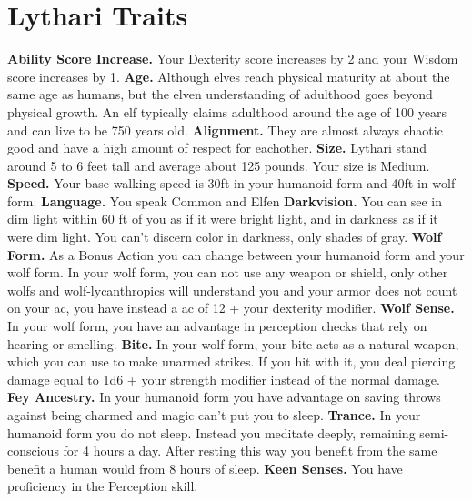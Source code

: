 \documentclass[a4paper,10pt,twoside,twocolumn, bg=print]{dndbook} %
\begin{document}
	\section{Lythari Traits}
	\textbf{Ability Score Increase.} Your Dexterity score increases by 2 and your Wisdom score increases by 1.\linebreak
	\textbf{Age.} Although elves reach physical maturity at about the same age as humans, but the elven understanding of adulthood goes beyond physical growth. An elf typically claims adulthood around the age of 100 years and can live to be 750 years old.\linebreak
	\textbf{Alignment.} They are almost always chaotic good and have a high amount of respect for eachother.\linebreak
	\textbf{Size.} Lythari stand around 5 to 6 feet tall and average about 125 pounds. Your size is Medium.\linebreak
	\textbf{Speed.} Your base walking speed is 30ft in your humanoid form and 40ft in wolf form.\linebreak
	\textbf{Language.} You speak Common and Elfen\linebreak
	\textbf{Darkvision.} You can see in dim light within 60 ft of you as if it were bright light, and in darkness as if it were dim light. You can't discern color in darkness, only shades of gray.\linebreak
	\textbf{Wolf Form.} As a Bonus Action you can change between your humanoid form and your wolf form. In your wolf form, you can not use any weapon or shield, only other wolfs and wolf-lycanthropics will understand you and your armor does not count on your ac, you have instead a ac of 12 + your dexterity modifier.\linebreak
	\textbf{Wolf Sense.} In your wolf form, you have an advantage in perception checks that rely on hearing or smelling.\linebreak
	\textbf{Bite.} In your wolf form, your bite acts as a natural weapon, which you can use to make unarmed strikes. If you hit with it, you deal piercing damage equal to 1d6 + your strength modifier instead of the normal damage.\linebreak
	\textbf{Fey Ancestry.} In your humanoid form you have advantage on saving throws against being charmed and magic can't put you to sleep.\linebreak
	\textbf{Trance.} In your humanoid form you do not sleep. Instead you meditate deeply, remaining semi-conscious for 4 hours a day. After resting this way you benefit from the same benefit a human would from 8 hours of sleep.\linebreak
	\textbf{Keen Senses.} You have proficiency in the Perception skill.\linebreak
	
\end{document}
